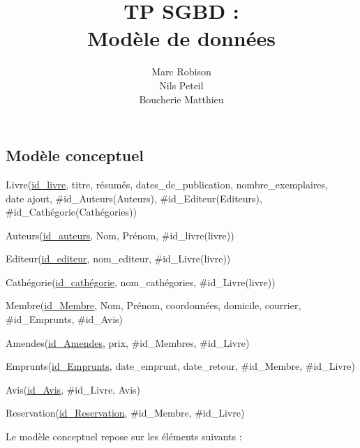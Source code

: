 \documentclass{article}
\title{TP SGBD : \\Modèle de données}
\author{Marc Robison\\
	Nils Peteil\\
  Boucherie Matthieu}
\begin{document}
\maketitle

\subsection{Modèle conceptuel}

\begin{tt}
  Livre(\underline{id\_livre}, titre, résumés, dates\_de\_publication, nombre\_exemplaires,\\ date ajout, \#id\_Auteurs(Auteurs), \#id\_Editeur(Editeurs), \#id\_Cathégorie(Cathégories))

\smallskip
Auteurs(\underline{id\_auteurs}, Nom, Prénom, \#id\_livre(livre))

\smallskip
Editeur(\underline{id\_editeur}, nom\_editeur, \#id\_Livre(livre))

\smallskip
Cathégorie(\underline{id\_cathégorie}, nom\_cathégories, \#id\_Livre(livre))
\smallskip

Membre(\underline{id\_Membre}, Nom, Prénom, coordonnées, domicile, courrier, \#id\_Emprunts, \#id\_Avis)
\smallskip

Amendes(\underline{id\_Amendes}, prix, \#id\_Membres, \#id\_Livre)
\smallskip

Emprunts(\underline{id\_Emprunts}, date\_emprunt, date\_retour, \#id\_Membre, \#id\_Livre)
\smallskip

Avis(\underline{id\_Avis}, \#id\_Livre, Avis)
\smallskip

Reservation(\underline{id\_Reservation}, \#id\_Membre, \#id\_Livre)
\end{tt}


\bigskip
Le modèle conceptuel repose sur les éléments suivants :
\end{document}
